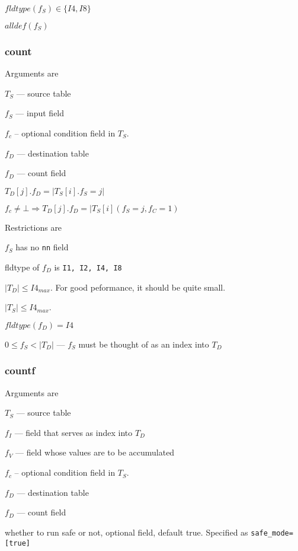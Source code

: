 \documentclass{report}
\begin{document}
\be
\item \(fldtype(f_S) \in \{I4, I8\}\)
\item \(alldef(f_S)\)
\ee


\subsubsection{count}
\label{count}
Arguments are 
\be
\item \(T_S\) --- source table
\item \(f_S\) --- input field 
\item \(f_c\) --  optional condition field in \(T_S\).
\item \(f_D\) --- destination table
\item \(f_D\) --- count field 
\ee

\(T_D[j].f_D = |T_S[i].f_S = j|\)

\(f_c \neq \bot \Rightarrow T_D[j].f_D = |T_S[i](f_S = j, f_C = 1)\)

Restrictions are 
\be
\item \(f_S\) has no {\tt nn} field 
\item fldtype of \(f_D\) is {\tt I1, I2, I4, I8}
\item \(|T_D| \leq I4_{max}\). For good peformance, it should be quite small.
\item \(|T_S| \leq I4_{max}\). 
\item \(fldtype(f_D) = I4\)
\item \(0 \leq f_S < |T_D| \) --- \(f_S\) must be thought of as an
index into \(T_D\)
\ee


\subsubsection{countf}
\label{countf}
Arguments are 
\be
\item \(T_S\) --- source table
\item \(f_I\) --- field that serves as index into \(T_D\)
\item \(f_V\) --- field whose values are to be accumulated
\item \(f_c\) --  optional condition field in \(T_S\).
\item \(f_D\) --- destination table
\item \(f_D\) --- count field 
\item whether to run safe or not, optional field, default true.
Specified as \verb+safe_mode=[true]+
\ee
\end{document}
